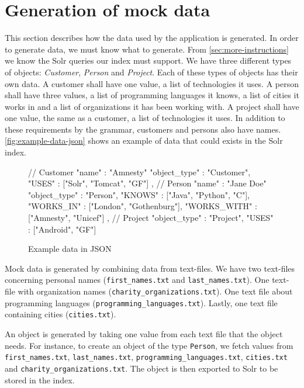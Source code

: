 \section{Generation of mock data}
This section describes how the data used by the application is generated. In order to generate data, we must know what to generate. From \autoref{sec:more-instructions} we know the Solr queries our index must support. We have three different types of objects: \emph{Customer}, \emph{Person} and \emph{Project}. Each of these types of objects has their own data. A customer shall have one value, a list of technologies it uses. A person shall have three values, a list of programming languages it knows, a list of cities it works in and a list of organizations it has been working with. A project shall have one value, the same as a customer, a list of technologies it uses. In addition to these requirements by the grammar, customers and persons also have names. \autoref{fig:example-data-json} shows an example of data that could exists in the Solr index.

\begin{figure}[H]
\begin{js-code}
{ // Customer
  "name" : "Amnesty"
  "object_type" : "Customer",
  "USES" : ["Solr", "Tomcat", "GF"]
},
{ // Person
  "name" : "Jane Doe"
  "object_type" : "Person",
  "KNOWS" : ["Java", "Python", "C"],
  "WORKS_IN" : ["London", "Gothenburg"],
  "WORKS_WITH" :  ["Amnesty", "Unicef"]
},
{ // Project
  "object_type" : "Project",
  "USES" : ["Android", "GF"]
}
\end{js-code}
\caption{Example data in JSON\label{fig:example-data-json}}
\end{figure}

Mock data is generated by combining data from text-files. We have two text-files concerning personal names (\texttt{first\_names.txt} and \texttt{last\_names.txt}). One text-file with organization names (\texttt{charity\_organizations.txt}). One text file about programming languages (\texttt{programming\_languages.txt}). Lastly, one text file containing cities (\texttt{cities.txt}). 

An object is generated by taking one value from each text file that the object needs. For instance, to create an object of the type \texttt{Person}, we fetch values from \texttt{first\_names.txt}, \texttt{last\_names.txt}, \texttt{programming\_languages.txt}, \texttt{cities.txt} and \texttt{charity\_organizations.txt}. The object is then exported to Solr to be stored in the index.